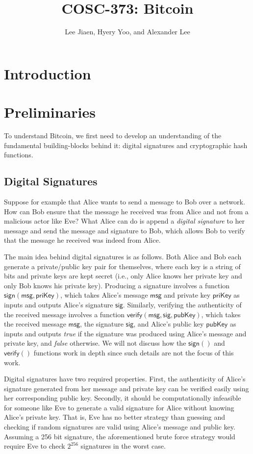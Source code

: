 \documentclass{article}
\title{COSC-373: Bitcoin}
\author{Lee Jiaen, Hyery Yoo, and Alexander Lee}
\begin{document}
\maketitle

\section{Introduction}

\section{Preliminaries}

To understand Bitcoin, we first need to develop an understanding of the
fundamental building-blocks behind it: digital signatures and cryptographic hash
functions.

\subsection{Digital Signatures}

Suppose for example that Alice wants to send a message to Bob over a network.
How can Bob ensure that the message he received was from Alice and not from a
malicious actor like Eve? What Alice can do is append a \emph{digital signature}
to her message and send the message and signature to Bob, which allows Bob to
verify that the message he received was indeed from Alice.

The main idea behind digital signatures is as follows. Both Alice and Bob each
generate a private/public key pair for themselves, where each key is a string of
bits and private keys are kept secret (i.e., only Alice knows her private key
and only Bob knows his private key). Producing a signature involves a function
$\mathsf{sign(msg, priKey)}$, which takes Alice's message $\mathsf{msg}$ and
private key $\mathsf{priKey}$ as inputs and outputs Alice's signature
$\mathsf{sig}$. Similarly, verifying the authenticity of the received message
involves a function $\mathsf{verify(msg, sig, pubKey)}$, which takes the
received message $\mathsf{msg}$, the signature $\mathsf{sig}$, and Alice's
public key $\mathsf{pubKey}$ as inputs and outputs \emph{true} if the signature
was produced using Alice's message and private key, and \emph{false} otherwise.
We will not discuss how the $\mathsf{sign()}$ and $\mathsf{verify()}$ functions
work in depth since such details are not the focus of this work.

Digital signatures have two required properties. First, the authenticity of
Alice's signature generated from her message and private key can be verified
easily using her corresponding public key. Secondly, it should be
computationally infeasible for someone like Eve to generate a valid signature
for Alice without knowing Alice's private key. That is, Eve has no better
strategy than guessing and checking if random signatures are valid using Alice's
message and public key. Assuming a 256 bit signature, the aforementioned brute
force strategy would require Eve to check $2^{256}$ signatures in the worst
case.
\end{document}
